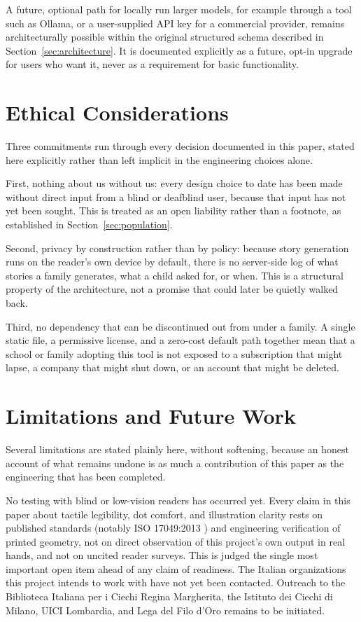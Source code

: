 \documentclass[conference]{IEEEtran}
\begin{document}
A future, optional path for locally run larger models, for example through a tool such as Ollama, or a user-supplied API key for a commercial provider, remains architecturally possible within the original structured schema described in Section~\ref{sec:architecture}. It is documented explicitly as a future, opt-in upgrade for users who want it, never as a requirement for basic functionality.

\section{Ethical Considerations}\label{sec:ethics}

Three commitments run through every decision documented in this paper, stated here explicitly rather than left implicit in the engineering choices alone.

First, nothing about us without us: every design choice to date has been made without direct input from a blind or deafblind user, because that input has not yet been sought. This is treated as an open liability rather than a footnote, as established in Section~\ref{sec:population}.

Second, privacy by construction rather than by policy: because story generation runs on the reader's own device by default, there is no server-side log of what stories a family generates, what a child asked for, or when. This is a structural property of the architecture, not a promise that could later be quietly walked back.

Third, no dependency that can be discontinued out from under a family. A single static file, a permissive license, and a zero-cost default path together mean that a school or family adopting this tool is not exposed to a subscription that might lapse, a company that might shut down, or an account that might be deleted.

\section{Limitations and Future Work}\label{sec:limitations}

Several limitations are stated plainly here, without softening, because an honest account of what remains undone is as much a contribution of this paper as the engineering that has been completed.

No testing with blind or low-vision readers has occurred yet. Every claim in this paper about tactile legibility, dot comfort, and illustration clarity rests on published standards (notably ISO 17049:2013 \cite{iso17049}) and engineering verification of printed geometry, not on direct observation of this project's own output in real hands, and not on uncited reader surveys. This is judged the single most important open item ahead of any claim of readiness. The Italian organizations this project intends to work with have not yet been contacted. Outreach to the Biblioteca Italiana per i Ciechi Regina Margherita, the Istituto dei Ciechi di Milano, UICI Lombardia, and Lega del Filo d'Oro remains to be initiated.
\end{document}

